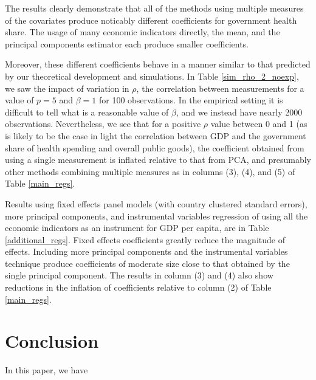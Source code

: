 \documentclass[10pt]{article}
\begin{document}
\clearpage
        
        
        

        The results clearly demonstrate that all of the methods using multiple measures of the covariates produce noticably different coefficients for government health share. The usage of many economic indicators directly, the mean, and the principal components estimator each produce smaller coefficients.

        Moreover, these different coefficients behave in a manner similar to that predicted by our theoretical development and simulations. In Table \ref{sim_rho_2_noexp}, we saw the impact of variation in $\rho$, the correlation between measurements for a value of $p = 5$ and $\beta = 1$ for 100 observations. In the empirical setting it is difficult to tell what is a reasonable value of $\beta$, and we instead have nearly 2000 observations. Nevertheless, we see that for a positive $\rho$ value between 0 and 1 (as is likely to be the case in light the correlation between GDP and the government share of health spending and overall public goods), the coefficient obtained from using a single measurement is inflated relative to that from PCA, and presumably other methods combining multiple measures as in columns (3), (4), and (5) of Table \ref{main_regs}.

        Results using fixed effects panel models (with country clustered standard errors), more principal components, and instrumental variables regression of using all the economic indicators as an instrument for GDP per capita, are in Table \ref{additional_regs}. Fixed effects coefficients greatly reduce the magnitude of effects. Including more principal components and the instrumental variables technique produce coefficients of moderate size close to that obtained by the single principal component. The results in column (3) and (4) also show reductions in the inflation of coefficients relative to column (2) of Table \ref{main_regs}.

        

    \section*{Conclusion}
        
In this paper, we have 
\end{document}
